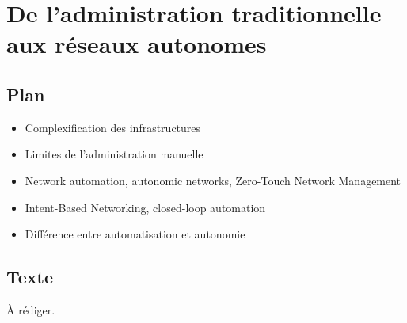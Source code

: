 \chapter{De l'administration traditionnelle aux réseaux autonomes}
\label{chap:partie-1}

\section{Plan}
\begin{itemize}
    \item Complexification des infrastructures
    \item Limites de l'administration manuelle
    \item Network automation, autonomic networks, Zero-Touch Network Management
    \item Intent-Based Networking, closed-loop automation
    \item Différence entre automatisation et autonomie
\end{itemize}

\section{Texte}
À rédiger.

